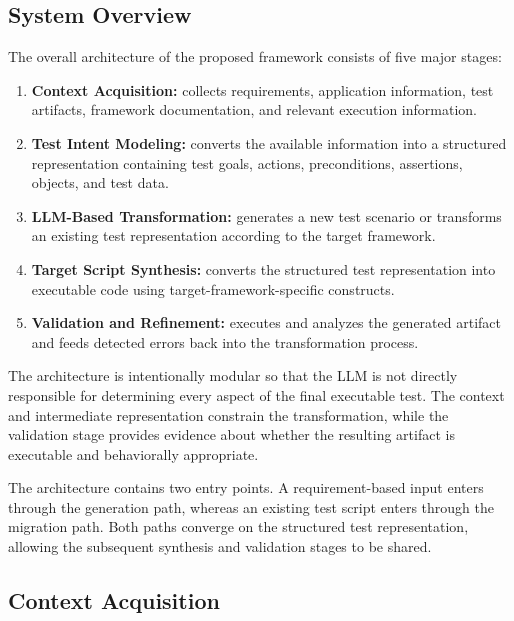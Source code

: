 \documentclass[pdflatex,sn-mathphys-num]{sn-jnl}
\begin{document}
\subsection{System Overview}
\label{subsec:system-overview}

The overall architecture of the proposed framework consists of five major
stages:

\begin{enumerate}
    \item \textbf{Context Acquisition:} collects requirements, application
    information, test artifacts, framework documentation, and relevant
    execution information.

    \item \textbf{Test Intent Modeling:} converts the available information
    into a structured representation containing test goals, actions,
    preconditions, assertions, objects, and test data.

    \item \textbf{LLM-Based Transformation:} generates a new test scenario
    or transforms an existing test representation according to the target
    framework.

    \item \textbf{Target Script Synthesis:} converts the structured test
    representation into executable code using target-framework-specific
    constructs.

    \item \textbf{Validation and Refinement:} executes and analyzes the
    generated artifact and feeds detected errors back into the
    transformation process.
\end{enumerate}

The architecture is intentionally modular so that the LLM is not directly
responsible for determining every aspect of the final executable test. The
context and intermediate representation constrain the transformation, while
the validation stage provides evidence about whether the resulting artifact
is executable and behaviorally appropriate.

The architecture contains two entry points. A requirement-based input enters
through the generation path, whereas an existing test script enters through
the migration path. Both paths converge on the structured test
representation, allowing the subsequent synthesis and validation stages to
be shared.

\subsection{Context Acquisition}
\label{subsec:context-acquisition}
\end{document}
